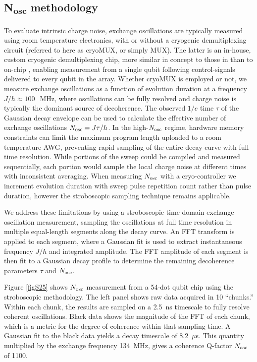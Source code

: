 \documentclass[aps,prl,twocolumn,superscriptaddress,nobibnotes,10pt,floatfix]{revtex4-2}
\newcommand{\ts}[2]{{#1}_{\textnormal{#2}}}
\newcommand{\Nosc}{\ensuremath{\ts{N}{osc}}}
\begin{document}
\subsection{N\textsubscript{osc} methodology}\label{nosc-methodology}

To evaluate intrinsic charge noise, exchange oscillations are typically measured using room temperature electronics, with or without a cryogenic demultiplexing circuit (referred to here as cryoMUX, or simply MUX).
The latter is an in-house, custom cryogenic demultiplexing chip, more similar in concept to those in \cite{s_paquelet_wuetz_multiplexed_2020, s_pauka_characterizing_2020} than to on-chip \cite{s_eastoe_method_2025, s_thomas_rapid_2025, s_tosato_crossbar_2026, s_wolfe_on-chip_2024, s_puddy_multiplexed_2015}, enabling measurement from a single qubit following control-signals delivered to every qubit in the array.
Whether cryoMUX is employed or not, we measure exchange oscillations as a function of evolution duration at a frequency \(J/h \approx 100\ \)~MHz, where oscillations can be fully resolved and charge noise is typically the dominant source of decoherence.
The observed \(1/e\) time \(\tau\) of the Gaussian decay envelope can be used to calculate the effective number of exchange oscillations \(\ts{N}{osc} = J\tau/h\).
In the high-\(\ts{N}{osc}\) regime, hardware memory constraints can limit the maximum program length uploaded to a room temperature AWG, preventing rapid sampling of the entire decay curve with full time resolution.
While portions of the sweep could be compiled and measured sequentially, each portion would sample the local charge noise at different times with inconsistent averaging.
When measuring \(\ts{N}{osc}\) with a cryo-controller we increment evolution duration with sweep pulse repetition count rather than pulse duration, however the stroboscopic sampling technique remains applicable.

We address these limitations by using a stroboscopic time-domain exchange oscillation measurement, sampling the oscillations at full time resolution in multiple equal-length segments along the decay curve.
An FFT transform is applied to each segment, where a Gaussian fit is used to extract instantaneous frequency \(J/h\) and integrated amplitude.
The FFT amplitude of each segment is then fit to a Gaussian decay profile to determine the remaining decoherence parameters \(\tau\) and \(\Nosc\).

Figure \ref{figS25} shows \(\Nosc\) measurement from a 54-dot qubit chip using the stroboscopic methodology.
The left panel shows raw data acquired in 10 ``chunks.''
Within each chunk, the results are sampled on a 2.5~ns timescale to fully resolve coherent oscillations.
Black data shows the magnitude of the FFT of each chunk, which is a metric for the degree of coherence within that sampling time.
A Gaussian fit to the black data yields a decay timescale of 8.2~$\mu$s.
This quantity multiplied by the exchange frequency 134~MHz, gives a coherence Q-factor \(\ts{N}{osc}\) of 1100.
\end{document}
